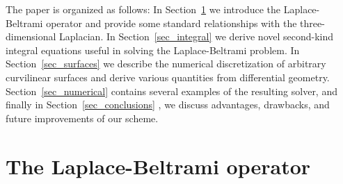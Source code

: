 \documentclass[11pt]{article}
\numberwithin{equation}{section}
\begin{document}
The paper is organized as follows:
In Section~\ref{sec_intro} we introduce the Laplace-Beltrami operator
and provide some standard relationships with the three-dimensional
Laplacian.
In Section~\ref{sec_integral} we derive novel second-kind integral
equations useful in solving the Laplace-Beltrami problem. In
Section~\ref{sec_surfaces} we describe the numerical discretization of
arbitrary curvilinear surfaces and derive various quantities from 
differential geometry. Section~\ref{sec_numerical} contains
several examples of the resulting solver, and finally in
Section~\ref{sec_conclusions} , we discuss
advantages, drawbacks, and future improvements  of our scheme.






\section{The Laplace-Beltrami operator}
\label{sec_intro}
\end{document}
